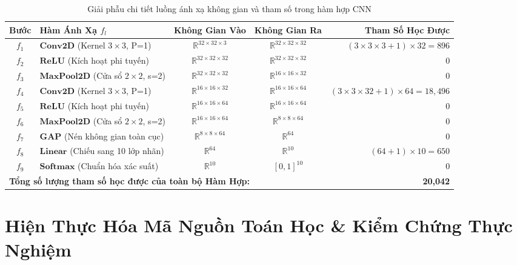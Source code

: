 \documentclass[12pt,a4paper]{report}
\begin{document}
\begin{table}[H]
\centering
\footnotesize
\caption{Giải phẫu chi tiết luồng ánh xạ không gian và tham số trong hàm hợp CNN}
\label{tab:tensor_shape_flow}
\begin{tabularx}{\textwidth}{c >{\raggedright\arraybackslash}X c c r}
\toprule
\textbf{Bước} & \textbf{Hàm Ánh Xạ $f_l$} & \textbf{Không Gian Vào} & \textbf{Không Gian Ra} & \textbf{Tham Số Học Được} \\
\midrule
$f_1$ & $\mathbf{Conv2D}$ (Kernel $3\times 3$, P=1) & $\mathbb{R}^{32 \times 32 \times 3}$ & $\mathbb{R}^{32 \times 32 \times 32}$ & $(3\times 3\times 3 + 1)\times 32 = 896$ \\
$f_2$ & $\mathbf{ReLU}$ (Kích hoạt phi tuyến) & $\mathbb{R}^{32 \times 32 \times 32}$ & $\mathbb{R}^{32 \times 32 \times 32}$ & $0$ \\
$f_3$ & $\mathbf{MaxPool2D}$ (Cửa sổ $2\times 2$, s=2) & $\mathbb{R}^{32 \times 32 \times 32}$ & $\mathbb{R}^{16 \times 16 \times 32}$ & $0$ \\
$f_4$ & $\mathbf{Conv2D}$ (Kernel $3\times 3$, P=1) & $\mathbb{R}^{16 \times 16 \times 32}$ & $\mathbb{R}^{16 \times 16 \times 64}$ & $(3\times 3\times 32 + 1)\times 64 = 18,496$ \\
$f_5$ & $\mathbf{ReLU}$ (Kích hoạt phi tuyến) & $\mathbb{R}^{16 \times 16 \times 64}$ & $\mathbb{R}^{16 \times 16 \times 64}$ & $0$ \\
$f_6$ & $\mathbf{MaxPool2D}$ (Cửa sổ $2\times 2$, s=2) & $\mathbb{R}^{16 \times 16 \times 64}$ & $\mathbb{R}^{8 \times 8 \times 64}$ & $0$ \\
$f_7$ & $\mathbf{GAP}$ (Nén không gian toàn cục) & $\mathbb{R}^{8 \times 8 \times 64}$ & $\mathbb{R}^{64}$ & $0$ \\
$f_8$ & $\mathbf{Linear}$ (Chiếu sang 10 lớp nhãn) & $\mathbb{R}^{64}$ & $\mathbb{R}^{10}$ & $(64 + 1)\times 10 = 650$ \\
$f_9$ & $\mathbf{Softmax}$ (Chuẩn hóa xác suất) & $\mathbb{R}^{10}$ & $[0, 1]^{10}$ & $0$ \\
\midrule
\multicolumn{4}{l}{\textbf{Tổng số lượng tham số học được của toàn bộ Hàm Hợp:}} & \textbf{20,042} \\
\bottomrule
\end{tabularx}
\end{table}

\newpage

\section{Hiện Thực Hóa Mã Nguồn Toán Học \& Kiểm Chứng Thực Nghiệm}
\end{document}
